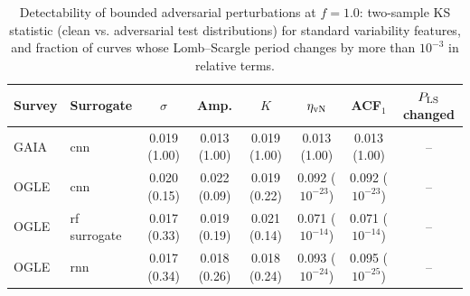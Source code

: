 \begin{table}
\caption{Detectability of bounded adversarial perturbations at $f=1.0$: two-sample KS statistic (clean vs. adversarial test distributions) for standard variability features, and fraction of curves whose Lomb--Scargle period changes by more than $10^{-3}$ in relative terms.}
\label{tab:detectability}
\centering
\begin{tabular}{llcccccc}
\hline\hline
Survey & Surrogate & $\sigma$ & Amp. & $K$ & $\eta_{\rm vN}$ & ACF$_1$ & $P_{\rm LS}$ changed \\
\hline
GAIA & cnn & 0.019 (1.00) & 0.013 (1.00) & 0.019 (1.00) & 0.013 (1.00) & 0.013 (1.00) & -- \\
OGLE & cnn & 0.020 (0.15) & 0.022 (0.09) & 0.019 (0.22) & 0.092 ($10^{-23}$) & 0.092 ($10^{-23}$) & -- \\
OGLE & rf surrogate & 0.017 (0.33) & 0.019 (0.19) & 0.021 (0.14) & 0.071 ($10^{-14}$) & 0.071 ($10^{-14}$) & -- \\
OGLE & rnn & 0.017 (0.34) & 0.018 (0.26) & 0.018 (0.24) & 0.093 ($10^{-24}$) & 0.095 ($10^{-25}$) & -- \\
\hline
\end{tabular}
\end{table}
